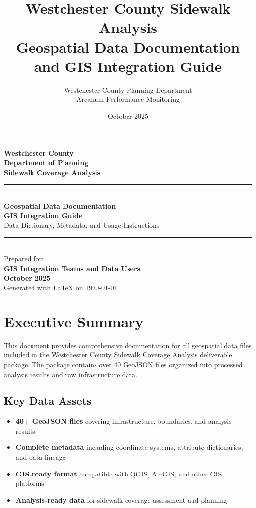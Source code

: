 \documentclass[11pt,letterpaper]{article}
\title{Westchester County Sidewalk Analysis\\
\large Geospatial Data Documentation and GIS Integration Guide}
\author{Westchester County Planning Department\\
Arcanum Performance Monitoring}
\date{October 2025}
\begin{document}
\begin{titlepage}
    \centering
    \vspace*{2cm}

    {\Large\bfseries Westchester County}\\[0.5cm]
    {\large\bfseries Department of Planning}\\[0.5cm]
    {\large\bfseries Sidewalk Coverage Analysis}\\[1cm]

    \rule{\textwidth}{1.5pt}\\[0.5cm]
    {\huge\bfseries Geospatial Data Documentation}\\[0.3cm]
    {\Large\bfseries GIS Integration Guide}\\[0.3cm]
    {\large Data Dictionary, Metadata, and Usage Instructions}\\[0.5cm]
    \rule{\textwidth}{1.5pt}\\[1cm]

    {\large Prepared for:}\\[0.3cm]
    {\large\bfseries GIS Integration Teams and Data Users}\\[1cm]

    {\large\bfseries October 2025}\\[1cm]

    \vfill
    {\small Generated with \LaTeX{} on \today}
\end{titlepage}

\tableofcontents
\newpage

\section{Executive Summary}

This document provides comprehensive documentation for all geospatial data files included in the Westchester County Sidewalk Coverage Analysis deliverable package. The package contains over 40 GeoJSON files organized into processed analysis results and raw infrastructure data.

\subsection{Key Data Assets}
\begin{itemize}
    \item \textbf{40+ GeoJSON files} covering infrastructure, boundaries, and analysis results
    \item \textbf{Complete metadata} including coordinate systems, attribute dictionaries, and data lineage
    \item \textbf{GIS-ready format} compatible with QGIS, ArcGIS, and other GIS platforms
    \item \textbf{Analysis-ready data} for sidewalk coverage assessment and planning
\end{itemize}
\end{document}
